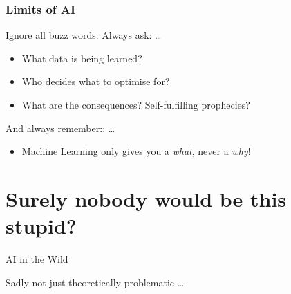 \documentclass[aspectratio=169,x11names]{beamer}
\begin{document}
\begin{frame}
\frametitle{Limits of AI}

Ignore all buzz words. Always ask: \dots \bigskip

\begin{itemize}
\pause\item What data is being learned?\\

\pause\item Who decides what to optimise for?\\

\pause\item What are the consequences? Self-fulfilling prophecies?\\
\end{itemize}

\pause\bigskip

And always remember:: \dots
\begin{itemize}
\item Machine Learning only gives you a \emph{what}, never a \emph{why}!
\end{itemize}
\end{frame}


\section{Surely nobody would be this stupid?}

\begin{frame}
\begin{center}
\huge
AI in the Wild
\bigskip

\large
Sadly not just theoretically problematic \dots
\end{center}
\end{frame}
\end{document}
